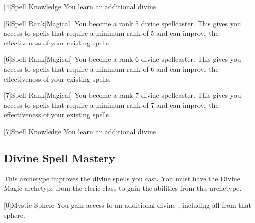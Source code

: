         [4]{Spell Knowledge} You learn an additional divine .

        [5]{Spell Rank}[Magical] You become a rank 5 divine spellcaster.
        This gives you access to spells that require a minimum rank of 5 and can improve the effectiveness of your existing spells.

        [6]{Spell Rank}[Magical] You become a rank 6 divine spellcaster.
        This gives you access to spells that require a minimum rank of 6 and can improve the effectiveness of your existing spells.

        [7]{Spell Rank}[Magical] You become a rank 7 divine spellcaster.
        This gives you access to spells that require a minimum rank of 7 and can improve the effectiveness of your existing spells.

        [7]{Spell Knowledge} You learn an additional divine .

    \newpage
    \subsection{Divine Spell Mastery}
        This archetype improves the divine spells you cast.
        You must have the Divine Magic archetype from the cleric class to gain the abilities from this archetype.

        [0]{Mystic Sphere} You gain access to an additional divine , including all  from that sphere.

